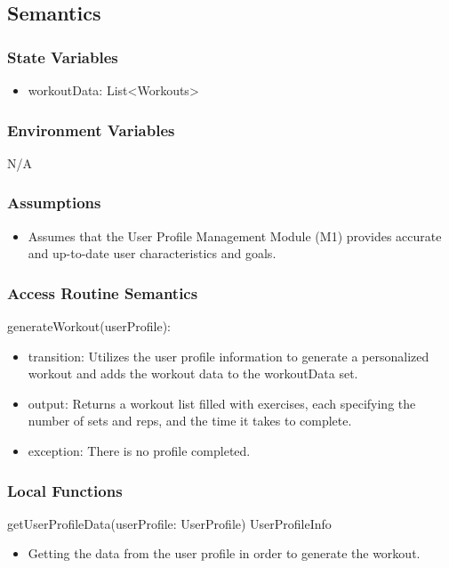 \documentclass[12pt, titlepage]{article}
\begin{document}
\subsection{Semantics}

\subsubsection{State Variables}
\begin{itemize}
\item workoutData: List\textless Workouts\textgreater
\end{itemize}

\subsubsection{Environment Variables}
N/A

\subsubsection{Assumptions}
\begin{itemize}
\item Assumes that the User Profile Management Module (M1) provides accurate and up-to-date user characteristics and goals.
\end{itemize}


\subsubsection{Access Routine Semantics}

\noindent generateWorkout(userProfile):
\begin{itemize}
\item transition: Utilizes the user profile information to generate a personalized workout and adds the workout data to the workoutData set.
\item output: Returns a workout list filled with exercises, each specifying the number of sets and reps, and the time it takes to complete.
\item exception: There is no profile completed.
\end{itemize}

\subsubsection{Local Functions}
\noindent getUserProfileData(userProfile: UserProfile) UserProfileInfo
\begin{itemize}
\item Getting the data from the user profile in order to generate the workout.
\end{itemize}
\end{document}
